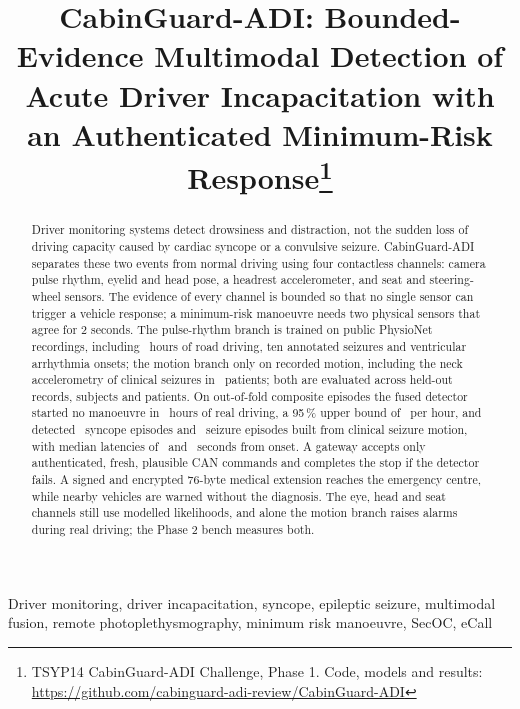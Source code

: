 \documentclass[conference]{IEEEtran}
\begin{document}
\title{CabinGuard-ADI: Bounded-Evidence Multimodal Detection of Acute Driver Incapacitation with an Authenticated Minimum-Risk Response\thanks{TSYP14 CabinGuard-ADI Challenge, Phase 1. Code, models and results: \protect\url{https://github.com/cabinguard-adi-review/CabinGuard-ADI}}}

\author{
}

\maketitle

\begin{abstract}
Driver monitoring systems detect drowsiness and distraction, not the sudden loss of driving capacity caused by cardiac syncope or a convulsive seizure. CabinGuard-ADI separates these two events from normal driving using four contactless channels: camera pulse rhythm, eyelid and head pose, a headrest accelerometer, and seat and steering-wheel sensors. The evidence of every channel is bounded so that no single sensor can trigger a vehicle response; a minimum-risk manoeuvre needs two physical sensors that agree for 2 seconds. The pulse-rhythm branch is trained on public PhysioNet recordings, including \DriveHours\ hours of road driving, ten annotated seizures and ventricular arrhythmia onsets; the motion branch only on recorded motion, including the neck accelerometry of clinical seizures in \MrSzBgPatients\ patients; both are evaluated across held-out records, subjects and patients. On out-of-fold composite episodes the fused detector started no manoeuvre in \FusionHours\ hours of real driving, a 95\,\% upper bound of \FaFullUpper\ per hour, and detected \SyFull\ syncope episodes and \SzFull\ seizure episodes built from clinical seizure motion, with median latencies of \LatSyFull\ and \LatSzFull\ seconds from onset. A gateway accepts only authenticated, fresh, plausible CAN commands and completes the stop if the detector fails. A signed and encrypted 76-byte medical extension reaches the emergency centre, while nearby vehicles are warned without the diagnosis. The eye, head and seat channels still use modelled likelihoods, and alone the motion branch raises alarms during real driving; the Phase 2 bench measures both.
\end{abstract}

\begin{IEEEkeywords}
Driver monitoring, driver incapacitation, syncope, epileptic seizure, multimodal fusion, remote photoplethysmography, minimum risk manoeuvre, SecOC, eCall
\end{IEEEkeywords}
\end{document}

